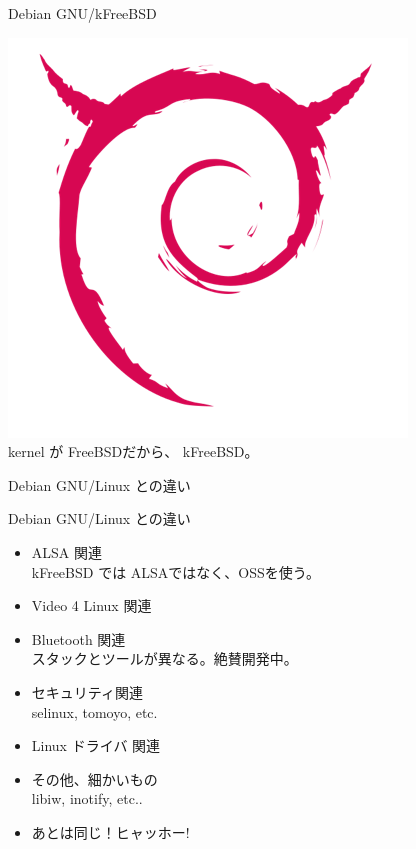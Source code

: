 \begin{frame}{Debian GNU/kFreeBSD}
\begin{center}
\includegraphics[width=0.5\hsize]{image201006/debian-kfreebsd.png}\\
kernel が FreeBSDだから、 kFreeBSD。
\end{center}
\end{frame}

\begin{frame}{Debian GNU/Linux との違い}

\end{frame}

\begin{frame}{Debian GNU/Linux との違い}
\begin{itemize}
\item<1-> ALSA 関連 \\
kFreeBSD では ALSAではなく、OSSを使う。
\item<2-> Video 4 Linux 関連
\item<3-> Bluetooth 関連\\
スタックとツールが異なる。絶賛開発中。
\item<4-> セキュリティ関連 \\
selinux, tomoyo, etc.
\item<5-> Linux ドライバ 関連
\item<6-> その他、細かいもの\\
libiw, inotify, etc.. 
\item<7-> あとは同じ！ヒャッホー!
\end{itemize}
\pause
\end{frame}


